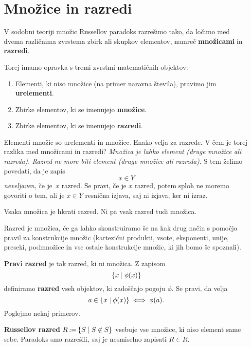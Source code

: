 \section{Množice in razredi}

V sodobni teoriji množic Russellov paradoks razrešimo tako, da ločimo med dvema
različnima zvrstema zbirk ali skupkov elementov, namreč \textbf{množicami} in \textbf{razredi}.

Torej imamo opravka s tremi zvrstmi matematičnih objektov:
%
\begin{enumerate}
\item Elementi, ki niso množice (na primer naravna števila), pravimo jim \textbf{urelementi}.
\item Zbirke elementov, ki se imenujejo \textbf{množice}.
\item Zbirke elementov, ki se imenujejo \textbf{razredi}.
\end{enumerate}
%
Elementi množic so urelementi in množice. Enako velja za razrede.
%
V čem je torej razlika med množicami in razredi?
%
\emph{Množica je lahko element (druge množice ali razreda).
Razred ne more biti element (druge množice ali razreda).}
%
S tem želimo povedati, da je zapis
%
\begin{equation*}
    x \in Y
  \end{equation*}
%
\emph{neveljaven}, če je~$x$ razred. Se pravi, če je $x$ razred, potem sploh ne moremo govoriti o tem, ali je $x \in Y$ resnična izjava, saj ni izjava, ker ni izraz.

Vsaka množica je hkrati razred. Ni pa vsak razred tudi množica.

Razred je množica, če ga lahko skonstruiramo še na kak drug način s pomočjo
pravil za konstrukcije množic (kartezični produkti, vsote, eksponenti, unije,
preseki, podmnožice in vse ostale konstrukcije množic, ki jih bomo še spoznali).

\textbf{Pravi razred} je tak razred, ki ni množica.
%
Z zapisom
%
\begin{equation*}
  \left\{ x \; \middle| \; \phi(x) \right\}
\end{equation*}
%
definiramo \textbf{razred} vseh objektov, ki zadoščajo pogoju $\phi$. Se pravi, da velja
%
\begin{equation*}
    a \in \left\{ x \; \middle| \; \phi(x) \right\} \iff \phi(a).
\end{equation*}
%
Poglejmo nekaj primerov.

\begin{zgled}
  \textbf{Russellov razred} $R \mathbin{{:}{=}} \left\{ S \; \middle| \; S \not\in S \right\}$ vsebuje vse množice, ki niso element same sebe. Paradoks smo razrešili, saj je nesmiselno zapisati $R \in R$.
\end{zgled}


